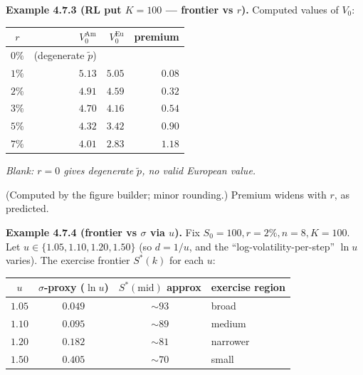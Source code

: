 \documentclass[
  10pt,
  twoside]{book}
\newcounter{none} %
\begin{document}
\textbf{Example 4.7.3 (RL put \(K = 100\) --- frontier vs \(r\)).}
Computed values of \(V_0\):

{\def\LTcaptype{none} %
\begin{table}[H]
\centering
\begin{tabular}{|c|r|r|r|}
\toprule
\(r\) & \(V_0^{\text{Am}}\) & \(V_0^{\text{Eu}}\) & premium \\
\midrule



\(0\%\) & (degenerate \(\tilde p\)) & & \\
\(1\%\) & \(5.13\) & \(5.05\) & \(0.08\) \\
\(2\%\) & \(4.91\) & \(4.59\) & \(0.32\) \\
\(3\%\) & \(4.70\) & \(4.16\) & \(0.54\) \\
\(5\%\) & \(4.32\) & \(3.42\) & \(0.90\) \\
\(7\%\) & \(4.01\) & \(2.83\) & \(1.18\) \\
\bottomrule
\end{tabular}
\end{table}
}

\emph{Blank: \(r=0\) gives degenerate \(\tilde p\), no valid European
value.}

(Computed by the figure builder; minor rounding.) Premium widens with
\(r\), as predicted.

\textbf{Example 4.7.4 (frontier vs \(\sigma\) via \(u\)).} Fix
\(S_0=100, r=2\%, n=8, K=100\). Let \(u \in \{1.05, 1.10, 1.20, 1.50\}\)
(so \(d = 1/u\), and the ``log-volatility-per-step'' \(\ln u\) varies).
The exercise frontier \(S^*(k)\) for each \(u\):

{\def\LTcaptype{none} %
\begin{table}[H]
\centering
\begin{tabular}{|c|c|c|l|}
\toprule
\(u\) & \(\sigma\)-proxy (\(\ln u\)) & \(S^*(\text{mid})\) approx & exercise region \\
\midrule



\(1.05\) & \(0.049\) & \(\sim 93\) & broad \\
\(1.10\) & \(0.095\) & \(\sim 89\) & medium \\
\(1.20\) & \(0.182\) & \(\sim 81\) & narrower \\
\(1.50\) & \(0.405\) & \(\sim 70\) & small \\
\bottomrule
\end{tabular}
\end{table}
}
\end{document}
